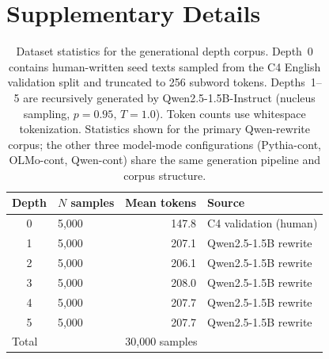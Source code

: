 \section{Supplementary Details}

\begin{table}[t]
  \centering
  \small
  \caption{Dataset statistics for the generational depth corpus. Depth~0 contains human-written seed texts sampled from the C4 English validation split and truncated to 256 subword tokens. Depths~1--5 are recursively generated by Qwen2.5-1.5B-Instruct (nucleus sampling, $p{=}0.95$, $T{=}1.0$). Token counts use whitespace tokenization. Statistics shown for the primary Qwen-rewrite corpus; the other three model-mode configurations (Pythia-cont, OLMo-cont, Qwen-cont) share the same generation pipeline and corpus structure.}
  \label{tab:s4_dataset_stats}
  \begin{tabular}{clrl}
    \toprule
    \textbf{Depth} & \textbf{$N$ samples} & \textbf{Mean tokens} & \textbf{Source} \\
    \midrule
    0 & 5{,}000 & 147.8 & C4 validation (human) \\
    1 & 5{,}000 & 207.1 & Qwen2.5-1.5B rewrite \\
    2 & 5{,}000 & 206.1 & Qwen2.5-1.5B rewrite \\
    3 & 5{,}000 & 208.0 & Qwen2.5-1.5B rewrite \\
    4 & 5{,}000 & 207.7 & Qwen2.5-1.5B rewrite \\
    5 & 5{,}000 & 207.7 & Qwen2.5-1.5B rewrite \\
    \midrule
    \multicolumn{2}{l}{Total} & \multicolumn{2}{l}{30{,}000 samples} \\
    \bottomrule
  \end{tabular}
\end{table}

